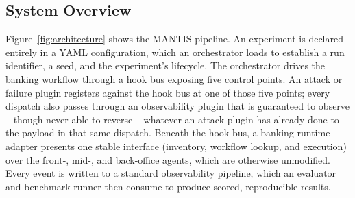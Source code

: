 \documentclass[conference]{IEEEtran}
\begin{document}
\subsection{System Overview}
Figure~\ref{fig:architecture} shows the MANTIS pipeline. An experiment is declared entirely in a YAML configuration, which an orchestrator loads to establish a run identifier, a seed, and the experiment's lifecycle. The orchestrator drives the banking workflow through a hook bus exposing five control points. An attack or failure plugin registers against the hook bus at one of those five points; every dispatch also passes through an observability plugin that is guaranteed to observe -- though never able to reverse -- whatever an attack plugin has already done to the payload in that same dispatch. Beneath the hook bus, a banking runtime adapter presents one stable interface (inventory, workflow lookup, and execution) over the front-, mid-, and back-office agents, which are otherwise unmodified. Every event is written to a standard observability pipeline, which an evaluator and benchmark runner then consume to produce scored, reproducible results.
\end{document}
